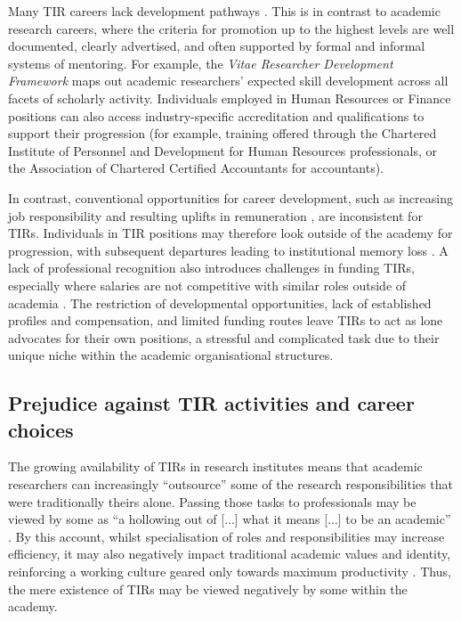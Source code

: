\documentclass[authordate,meta]{jote-new-article}
\begin{document}
Many TIR careers lack development pathways \parencites{NCRIS2022}{Virágh2019}. This is in contrast to academic research careers, where the criteria for promotion up to the highest levels are well documented, clearly advertised, and often supported by formal and informal systems of mentoring. For example, the \emph{Vitae Researcher Development Framework} \parencites{Vitae2014} maps out academic researchers' expected skill development across all facets of scholarly activity. Individuals employed in Human Resources or Finance positions can also access industry-specific accreditation and qualifications to support their progression (for example, training offered through the Chartered Institute of Personnel and Development for Human Resources professionals, or the Association of Chartered Certified Accountants for accountants).







In contrast, conventional opportunities for career development, such as increasing job responsibility and resulting uplifts in remuneration \parencites{UKRI-ResearchEngland2022}{Virágh2019}, are inconsistent for TIRs. Individuals in TIR positions may therefore look outside of the academy for progression, with subsequent departures leading to institutional memory loss \parencites{Bossu2018}{McInturff2022}. A lack of professional recognition also introduces challenges in funding TIRs, especially where salaries are not competitive with similar roles outside of academia \parencites{UKRI-ResearchEngland2022}. The restriction of developmental opportunities, lack of established profiles and compensation, and limited funding routes leave TIRs to act as lone advocates for their own positions, a stressful and complicated task due to their unique niche within the academic organisational structures.



\subsection{Prejudice against TIR activities and career choices}



The growing availability of TIRs in research institutes means that academic researchers can increasingly “outsource” some of the research responsibilities that were traditionally theirs alone. Passing those tasks to professionals may be viewed by some as “a hollowing out of [...] what it means [...] to be an academic” \parencites[71]{Macfarlane2011}. By this account, whilst specialisation of roles and responsibilities may increase efficiency, it may also negatively impact traditional academic values and identity, reinforcing a working culture geared only towards maximum productivity \parencites{Beatson2021}{Limas2022}{WellcomeTrust2020}. Thus, the mere existence of TIRs may be viewed negatively by some within the academy.
\end{document}
